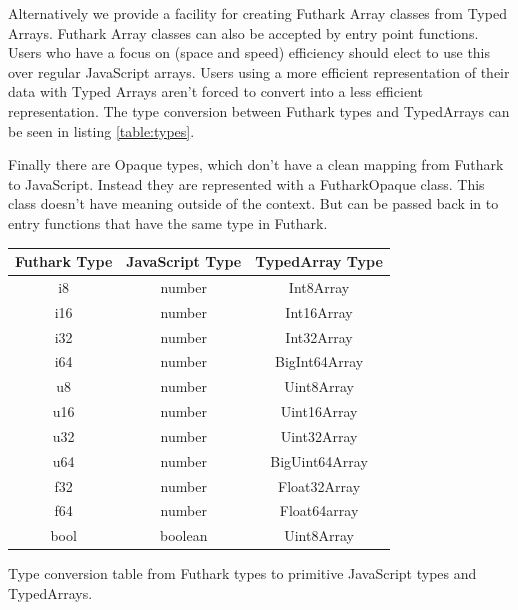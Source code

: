 \documentclass[11pt]{book}
\begin{document}
Alternatively we provide a facility for creating Futhark Array classes from Typed Arrays. Futhark Array classes can also be accepted by entry point functions. Users who have a focus on (space and speed) efficiency should elect to use this over regular JavaScript arrays. Users using a more efficient representation of their data with Typed Arrays aren't forced to convert into a less efficient representation. The type conversion between Futhark types and TypedArrays can be seen in listing \ref{table:types}.

Finally there are Opaque types, which don't have a clean mapping from Futhark to JavaScript. Instead they are represented with a FutharkOpaque class. This class doesn't have meaning outside of the context. But can be passed back in to entry functions that have the same type in Futhark.

\begin{listing}[H] 
\begin{table}[H]
\centering

\begin{tabular}{|c|c|c|}
\hline
\textbf{Futhark Type} & \textbf{JavaScript Type} & \textbf{TypedArray Type} \\ \hline
i8                    & number                   & Int8Array                \\ \hline
i16                   & number                   & Int16Array               \\ \hline
i32                   & number                   & Int32Array               \\ \hline
i64                   & number                   & BigInt64Array            \\ \hline
u8                    & number                   & Uint8Array               \\ \hline
u16                   & number                   & Uint16Array              \\ \hline
u32                   & number                   & Uint32Array              \\ \hline
u64                   & number                   & BigUint64Array           \\ \hline
f32                   & number                   & Float32Array             \\ \hline
f64                   & number                   & Float64array             \\ \hline
bool                  & boolean                  & Uint8Array               \\ \hline
\end{tabular}
\end{table}
\caption{Type conversion table from Futhark types to primitive JavaScript types and TypedArrays.}
\label{table:types}
\end{listing}
\end{document}
